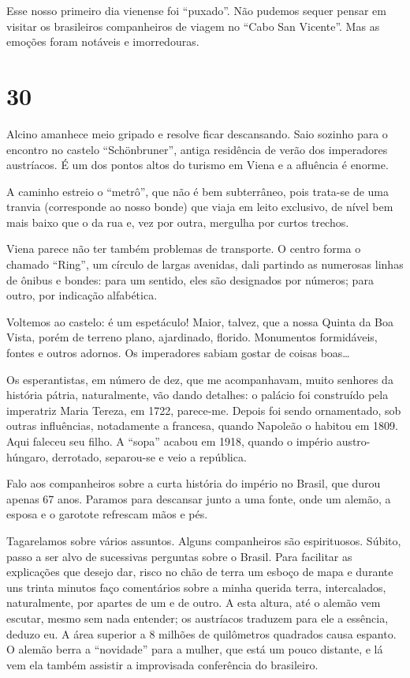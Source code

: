 Esse nosso primeiro dia vienense foi ``puxado''. Não pudemos sequer pensar em visitar os brasileiros companheiros de viagem no ``Cabo San Vicente''. Mas as emoções foram notáveis e imorredouras.

\section*{30 \adfflatleafright {}}
Alcino amanhece meio gripado e resolve ficar descansando. Saio sozinho para o encontro no castelo ``Schönbruner'', antiga residência de verão dos imperadores austríacos. É um dos pontos altos do turismo em Viena e a afluência é enorme.

A caminho estreio o ``metrô'', que não é bem subterrâneo, pois trata-se de uma tranvia (corresponde ao nosso bonde) que viaja em leito exclusivo, de nível bem mais baixo que o da rua e, vez por outra, mergulha por curtos trechos.

Viena parece não ter também problemas de transporte. O centro forma o chamado ``Ring'', um círculo de largas avenidas, dali partindo as numerosas linhas de ônibus e bondes: para um sentido, eles são designados por números; para outro, por indicação alfabética.

Voltemos ao castelo: é um espetáculo! Maior, talvez, que a nossa Quinta da Boa Vista, porém de terreno plano, ajardinado, florido. Monumentos formidáveis, fontes e outros adornos. Os imperadores sabiam gostar de coisas boas\ldots

Os esperantistas, em número de dez, que me acompanhavam, muito senhores da história pátria, naturalmente, vão dando detalhes: o palácio foi construído pela imperatriz Maria Tereza, em 1722, parece-me. Depois foi sendo ornamentado, sob outras influências, notadamente a francesa, quando Napoleão o habitou em 1809. Aqui faleceu seu filho. A ``sopa'' acabou em 1918, quando o império austro-húngaro, derrotado, separou-se e veio a república.

Falo aos companheiros sobre a curta história do império no Brasil, que durou apenas 67 anos. Paramos para descansar junto a uma fonte, onde um alemão, a esposa e o garotote refrescam mãos e pés.

Tagarelamos sobre vários assuntos. Alguns companheiros são espirituosos. Súbito, passo a ser alvo de sucessivas perguntas sobre o Brasil. Para facilitar as explicações que desejo dar, risco no chão de terra um esboço de mapa e durante uns trinta minutos faço comentários sobre a minha querida terra, intercalados, naturalmente, por apartes de um e de outro. A esta altura, até o alemão vem escutar, mesmo sem nada entender; os austríacos traduzem para ele a essência, deduzo eu. A área superior a 8 milhões de quilômetros quadrados causa espanto. O alemão berra a ``novidade'' para a mulher, que está um pouco distante, e lá vem ela também assistir a improvisada conferência do brasileiro.

